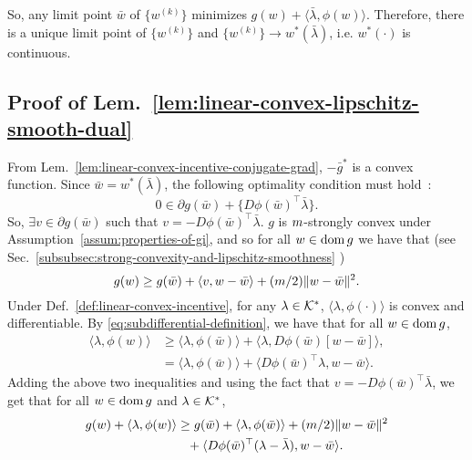 So, any limit point $\bar{w}$ of $\{w^{(k)}\}$ minimizes $g(w) + \langle \bar{\lambda}, \phi(w)\rangle$.
Therefore, there is a unique limit point of $\{w^{(k)}\}$ and $\{w^{(k)}\} \rightarrow w^*(\bar{\lambda})$, i.e. $w^*(\cdot)$ is continuous.


\subsection{Proof of Lem.~\ref{lem:linear-convex-lipschitz-smooth-dual}}
\label{subapp:proof-linear-convex-lipschitz-smooth-dual}

From Lem.~\ref{lem:linear-convex-incentive-conjugate-grad}, $-\bar{g}^*$ is a convex function.
Since $\bar{w} = w^*(\bar{\lambda})$, the following optimality condition must hold~\cite[Thm.~23.8]{rockafellar1997convex}:
\begin{equation*}
    0 \in \partial g(\bar{w}) + \{D \phi(\bar{w})^\top \bar{\lambda}\}.
\end{equation*}
So, $\exists v \in \partial g(\bar{w})$ such that $v = -D \phi(\bar{w})^\top \bar{\lambda}$.
$g$ is $m$-strongly convex under Assumption~\ref{assum:properties-of-gi}, and so for all $w \in \operatorname{dom}{g}$ we have that (see Sec.~\ref{subsubsec:strong-convexity-and-lipschitz-smoothness}%
)
\begin{equation*}
    g(w) \geq g(\bar{w}) + \langle v, w - \bar{w}\rangle + (m/2) \lVert w - \bar{w}\rVert^2.
\end{equation*}
Under Def.~\ref{def:linear-convex-incentive}, for any $\lambda \in \mathcal{K}^*$, $\langle \lambda, \phi(\cdot) \rangle$ is convex and differentiable.
By \eqref{eq:subdifferential-definition}, we have that for all $w \in \operatorname{dom}{g}$,
\begin{equation*}
\begin{split}
    \langle \lambda, \phi(w)\rangle & \geq \langle \lambda, \phi(\bar{w})\rangle + \langle \lambda, D \phi(\bar{w})[w - \bar{w}]\rangle, \\
    & = \langle \lambda, \phi(\bar{w})\rangle + \langle D \phi(\bar{w})^\top \lambda, w - \bar{w}\rangle.
\end{split}
\end{equation*}
Adding the above two inequalities and using the fact that $v = -D \phi(\bar{w})^\top \bar{\lambda}$, we get that for all $w \in \operatorname{dom}{g}$ and $\lambda \in \mathcal{K}^*$,
\begin{equation*}
\begin{split}
    g(w) + \langle \lambda, \phi(w)\rangle & \geq g(\bar{w}) + \langle \lambda, \phi(\bar{w})\rangle + (m/2) \lVert w - \bar{w}\rVert^2\\
    & \text{\phantom{$\geq$}} + \langle D \phi(\bar{w})^\top (\lambda - \bar{\lambda}), w - \bar{w}\rangle.
\end{split}
\end{equation*}
